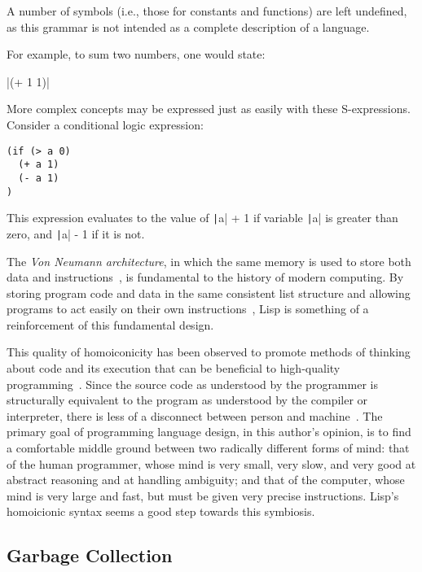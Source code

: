 \documentclass[11pt,a4paper]{article}
\theoremstyle{break}
\begin{document}
A number of symbols (i.e., those for constants and functions) are left undefined, as this grammar is not intended as a complete description of a language.

For example, to sum two numbers, one would state:

\begin{listing*}[h!]
    \centering
    |(+ 1 1)|
\end{listing*}

More complex concepts may be expressed just as easily with these S-expressions. Consider a conditional logic expression:

\begin{listing*}[h!]
    \centering
\begin{verbatim}
(if (> a 0)
  (+ a 1)
  (- a 1)
)
\end{verbatim}
\end{listing*}
This expression evaluates to the value of \texttt|a| + 1 if variable \texttt|a| is greater than zero, and \texttt|a| - 1 if it is not.

The \textit{Von Neumann architecture}, in which the same memory is used to store both data and instructions~\cite{von1993first}, is fundamental to the history of modern computing. By storing program code and data in the same consistent list structure and allowing programs to act easily on their own instructions~\cite{Smith:1984:RSL:800017.800513}, Lisp is something of a reinforcement of this fundamental design.

This quality of homoiconicity has been observed to promote methods of thinking about code and its execution that can be beneficial to high-quality programming~\cite{sicp,raymond2003become}. Since the source code as understood by the programmer is structurally equivalent to the program as understood by the compiler or interpreter, there is less of a disconnect between person and machine~\cite{sicp}. The primary goal of programming language design, in this author's opinion, is to find a comfortable middle ground between two radically different forms of mind: that of the human programmer, whose mind is very small, very slow, and very good at abstract reasoning and at handling ambiguity; and that of the computer, whose mind is very large and fast, but must be given very precise instructions. Lisp's homoicionic syntax seems a good step towards this symbiosis.

\subsection{Garbage Collection}\label{subsec:gc}
\end{document}
